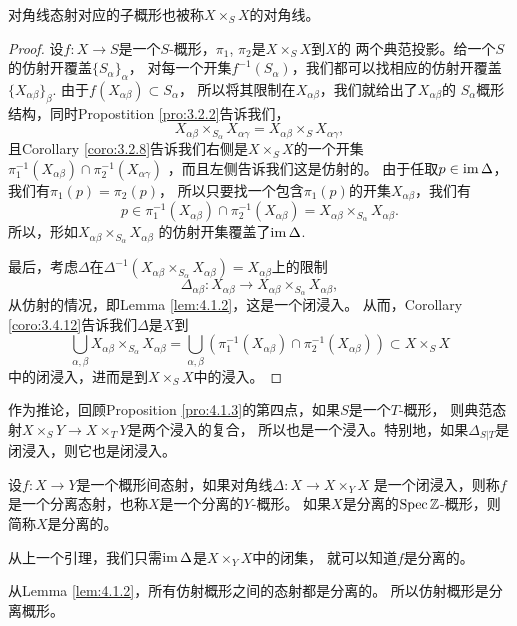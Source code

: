 对角线态射对应的子概形也被称$X\times_S X$的对角线。

\begin{proof}
设$f:X\to S$是一个$S$-概形，$\pi_1$, $\pi_2$是$X\times_S X$到$X$的
两个典范投影。给一个$S$的仿射开覆盖$\{S_\alpha\}_\alpha$，
对每一个开集$f^{-1}(S_\alpha)$，我们都可以找相应的仿射开覆盖
$\{X_{\alpha\beta}\}_\beta$. 由于$f(X_{\alpha\beta})\subset S_{\alpha}$，
所以将其限制在$X_{\alpha\beta}$，我们就给出了$X_{\alpha\beta}$的
$S_\alpha$概形结构，同时Propostition \ref{pro:3.2.2}告诉我们，
\[
	X_{\alpha\beta}\times_{S_\alpha}X_{\alpha\gamma}=
	X_{\alpha\beta}\times_{S}X_{\alpha\gamma},
\]
且Corollary \ref{coro:3.2.8}告诉我们右侧是$X\times_S X$的一个开集
$\pi_1^{-1}(X_{\alpha\beta})\cap \pi_2^{-1}(X_{\alpha\gamma})$
，而且左侧告诉我们这是仿射的。
由于任取$p\in \operatorname{im} \Delta$，我们有$\pi_1(p)=\pi_2(p)$，
所以只要找一个包含$\pi_1(p)$的开集$X_{\alpha\beta}$，我们有
\[
p\in \pi_1^{-1}(X_{\alpha\beta})\cap \pi_2^{-1}(X_{\alpha\beta})=
X_{\alpha\beta}\times_{S_\alpha}X_{\alpha\beta}.
\]
所以，形如$X_{\alpha\beta}\times_{S_\alpha}X_{\alpha\beta}$
的仿射开集覆盖了$\operatorname{im} \Delta$. 

最后，考虑$\Delta$在$\Delta^{-1}(X_{\alpha\beta}\times_{S_\alpha}
X_{\alpha\beta})=X_{\alpha\beta}$上的限制
\[
	\Delta_{\alpha\beta}:X_{\alpha\beta}\to X_{\alpha\beta}
	\times_{S_\alpha}X_{\alpha\beta},
\]
从仿射的情况，即Lemma \ref{lem:4.1.2}，这是一个闭浸入。
从而，Corollary \ref{coro:3.4.12}告诉我们$\Delta$是$X$到
\[
\bigcup_{\alpha,\beta}X_{\alpha\beta}\times_{S_\alpha}X_{\alpha\beta}
=\bigcup_{\alpha,\beta}\left(\pi_1^{-1}(X_{\alpha\beta})\cap 
\pi_2^{-1}(X_{\alpha\beta})\right)\subset X\times_S X
\]
中的闭浸入，进而是到$X\times_S X$中的浸入。
\end{proof}

作为推论，回顾Proposition \ref{pro:4.1.3}的第四点，如果$S$是一个$T$-概形，
则典范态射$X\times_S Y\to X\times_T Y$是两个浸入的复合，
所以也是一个浸入。特别地，如果$\Delta_{S|T}$是闭浸入，则它也是闭浸入。

\begin{para}[分离性]
设$f:X\to Y$是一个概形间态射，如果对角线$\Delta:X\to X\times_Y X$
是一个闭浸入，则称$f$是一个分离态射，也称$X$是一个分离的$Y$-概形。
如果$X$是分离的$\operatorname{Spec} \mathbb{Z}$-概形，则简称$X$是分离的。
\end{para}

从上一个引理，我们只需$\operatorname{im} \Delta$是$X\times_Y X$中的闭集，
就可以知道$f$是分离的。

从Lemma \ref{lem:4.1.2}，所有仿射概形之间的态射都是分离的。
所以仿射概形是分离概形。

